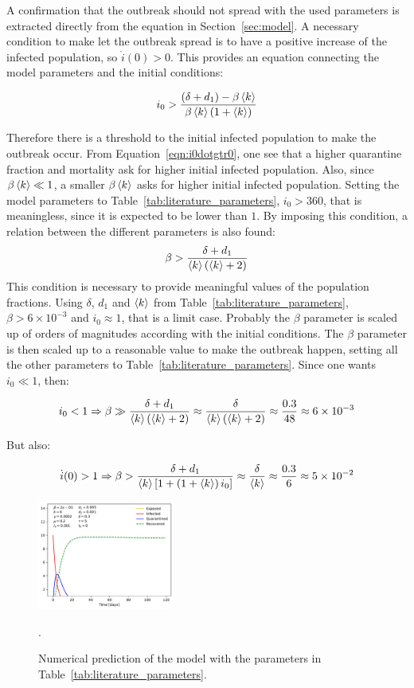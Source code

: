 A confirmation that the outbreak should not spread with the used parameters is extracted directly from the equation in Section~\ref{sec:model}. A necessary condition to make let the outbreak spread is to have a positive increase of the infected population, so $\dot{i}(0)>0$. This provides an equation connecting the model parameters and the initial conditions:

\begin{equation}
i_0 > \frac{\left(\delta+d_1\right)-\beta\braket{k}}{\beta\braket{k}(1+\braket{k})}
\label{eqn:i0dotgtr0}
\end{equation}

Therefore there is a threshold to the initial infected population to make the outbreak occur. From Equation~\ref{eqn:i0dotgtr0}, one see that a higher quarantine fraction and mortality ask for higher initial infected population. Also, since $\beta\braket{k}\ll1$, a smaller $\beta\braket{k}$ asks for higher initial infected population. Setting the model parameters to Table~\ref{tab:literature_parameters}, $i_0>360$, that is meaningless, since it is expected to be lower than $1$. By imposing this condition, a relation between the different parameters is also found: 
\begin{equation}
\beta > \frac{\delta + d_1}{\braket{k}(\braket{k}+2)}
\label{eqn:i0low1}
\end{equation}
This condition is necessary to provide meaningful values of the population fractions. Using $\delta$, $d_1$ and $\braket{k}$ from Table~\ref{tab:literature_parameters}, $\beta>6\times10^{-3}$ and $i_0\approx1$, that is a limit case. Probably the $\beta$ parameter is scaled up of orders of magnitudes according with the initial conditions. The $\beta$ parameter is then scaled up to a reasonable value to make the outbreak happen, setting all the other parameters to Table~\ref{tab:literature_parameters}. Since one wants $i_0\ll1$, then:

\begin{equation}
i_0<1 \Rightarrow \beta\gg \frac{\delta + d_1}{\braket{k}(\braket{k}+2)} \approx \frac{\delta}{\braket{k}(\braket{k}+2)} \approx \frac{0.3}{48} \approx 6\times10^{-3}
\label{eqn:numerical_i0low1}
\end{equation}

But also: 

\begin{equation}
\dot{i}(0)>1 \Rightarrow \beta > \frac{\delta + d_1}{\braket{k}\left[1+\left(1+\braket{k}\right)i_0\right]} \approx \frac{\delta}{\braket{k}} \approx \frac{0.3}{6} \approx 5\times10^{-2}
\label{eqn:numerical_i0dotgtr1}
\end{equation}

\begin{figure}[!ht]\centering
\includegraphics[width=0.4\textwidth]{imgs/ModelDescription/Summary_parameters_nominal.pdf}
\caption{Numerical prediction of the model with the parameters in Table~\ref{tab:literature_parameters}.}.
\label{fig:model_literature}
\end{figure}